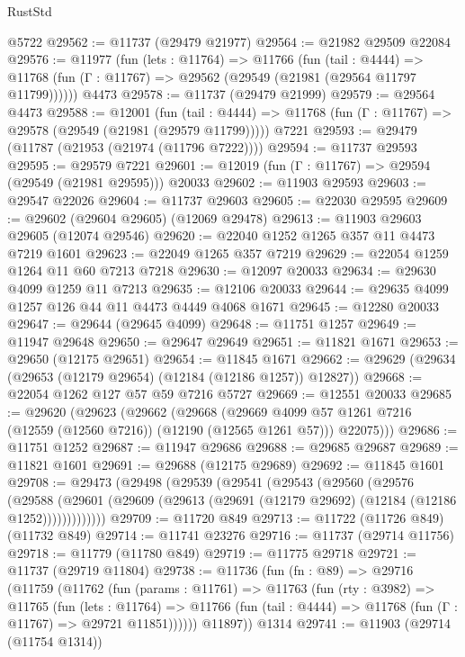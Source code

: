 \begin{lexlean}{RustStd}
\begin{coremodule}
    @5722
@29562 := @11737 (@29479 @21977)
@29564 := @21982 @29509 @22084
@29576 := @11977
    (fun (lets : @11764) =>
    @11766
      (fun (tail : @4444) =>
      @11768 (fun (Γ : @11767) => @29562 (@29549 (@21981 (@29564 @11797 @11799))))))
    @4473
@29578 := @11737 (@29479 @21999)
@29579 := @29564 @4473
@29588 := @12001
    (fun (tail : @4444) => @11768 (fun (Γ : @11767) => @29578 (@29549 (@21981 (@29579 @11799)))))
    @7221
@29593 := @29479 (@11787 (@21953 (@21974 (@11796 @7222))))
@29594 := @11737 @29593
@29595 := @29579 @7221
@29601 := @12019 (fun (Γ : @11767) => @29594 (@29549 (@21981 @29595))) @20033
@29602 := @11903 @29593
@29603 := @29547 @22026
@29604 := @11737 @29603
@29605 := @22030 @29595
@29609 := @29602 (@29604 @29605) (@12069 @29478)
@29613 := @11903 @29603 @29605 (@12074 @29546)
@29620 := @22040 @1252 @1265 @357 @11 @4473 @7219 @1601
@29623 := @22049 @1265 @357 @7219
@29629 := @22054 @1259 @1264 @11 @60 @7213 @7218
@29630 := @12097 @20033
@29634 := @29630 @4099 @1259 @11 @7213
@29635 := @12106 @20033
@29644 := @29635 @4099 @1257 @126 @44 @11 @4473 @4449 @4068 @1671
@29645 := @12280 @20033
@29647 := @29644 (@29645 @4099)
@29648 := @11751 @1257
@29649 := @11947 @29648
@29650 := @29647 @29649
@29651 := @11821 @1671
@29653 := @29650 (@12175 @29651)
@29654 := @11845 @1671
@29662 := @29629 (@29634 (@29653 (@12179 @29654) (@12184 (@12186 @1257)) @12827))
@29668 := @22054 @1262 @127 @57 @59 @7216 @5727
@29669 := @12551 @20033
@29685 := @29620
    (@29623
      (@29662
        (@29668
          (@29669 @4099 @57 @1261 @7216 (@12559 (@12560 @7216)) (@12190 (@12565 @1261 @57)))
          @22075)))
@29686 := @11751 @1252
@29687 := @11947 @29686
@29688 := @29685 @29687
@29689 := @11821 @1601
@29691 := @29688 (@12175 @29689)
@29692 := @11845 @1601
@29708 := @29473
    (@29498
      (@29539
        (@29541
          (@29543
            (@29560
              (@29576
                (@29588
                  (@29601 (@29609 (@29613 (@29691 (@12179 @29692) (@12184 (@12186 @1252)))))))))))))
@29709 := @11720 @849
@29713 := @11722 (@11726 @849) (@11732 @849)
@29714 := @11741 @23276
@29716 := @11737 (@29714 @11756)
@29718 := @11779 (@11780 @849)
@29719 := @11775 @29718
@29721 := @11737 (@29719 @11804)
@29738 := @11736
    (fun (fn : @89) =>
    @29716
      (@11759
        (@11762
          (fun (params : @11761) =>
          @11763
            (fun (rty : @3982) =>
            @11765
              (fun (lets : @11764) =>
              @11766 (fun (tail : @4444) => @11768 (fun (Γ : @11767) => @29721 @11851))))))
        @11897))
    @1314
@29741 := @11903 (@29714 (@11754 @1314))

\end{coremodule}
\end{lexlean}
